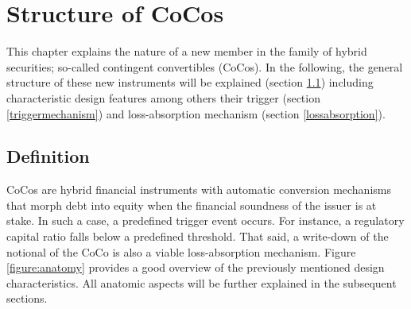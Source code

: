 \chapter{Structure of CoCos}

This chapter explains the nature of a new member in the family of hybrid securities; so-called contingent convertibles (CoCos). In the following, the general structure of these new instruments will be explained (section \ref{definitioncocos}) including characteristic design features among others their trigger (section \ref{triggermechanism}) and loss-absorption mechanism (section \ref{lossabsorption}).

\section{Definition}\label{definitioncocos}

CoCos are hybrid financial instruments with automatic conversion mechanisms that morph debt into equity when the financial soundness of the issuer is at stake. In such a case, a predefined trigger event occurs. For instance, a regulatory capital ratio falls below a predefined threshold. That said, a write-down of the notional of the CoCo is also a viable loss-absorption mechanism. \citep{de2011pricing} Figure \ref{figure:anatomy} provides a good overview of the previously mentioned design characteristics. All anatomic aspects will be further explained in the subsequent sections.\\

